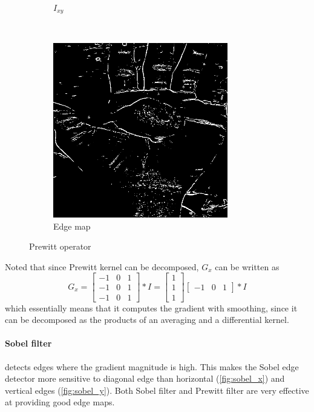 \documentclass[12pt]{article}
\begin{document}
\begin{figure}[ht!]
\begin{subfigure}[t]{0.5\textwidth}
        \caption{$I_{xy}$}
    \end{subfigure}%
    ~
    \begin{subfigure}[t]{0.5\textwidth}
        \centering
        \includegraphics[height=3in]{images/prewitt_edge}
        \caption{Edge map}
    \end{subfigure}
    \caption{Prewitt operator}
\end{figure}

Noted that since Prewitt kernel can be decomposed, $G_x$ can be written as 
\begin{equation}
	G_x = \begin{bmatrix}
		-1 & 0 & 1 \\ -1 & 0 & 1 \\ -1 & 0 & 1 
	\end{bmatrix} \ast I
	= \begin{bmatrix}
		1 \\ 1 \\ 1 
	\end{bmatrix} \begin{bmatrix}
 		-1 & 0 & 1	
	\end{bmatrix}
	\ast I
\end{equation}
which essentially means that it computes the gradient with smoothing, since it can be decomposed as the products of an averaging and a differential kernel.

\paragraph*{Sobel filter} detects edges where the gradient magnitude is high. 
This makes the Sobel edge detector more sensitive to diagonal edge than horizontal (\autoref{fig:sobel_x}) and vertical edges (\autoref{fig:sobel_y}). 
Both Sobel filter and Prewitt filter are very effective at providing good edge maps.
\end{document}
